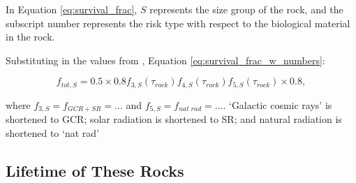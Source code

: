 \documentclass{article}
\begin{document}
In Equation \ref{eq:survival_frac}, $S$ represents the size group of the rock, and the subscript number represents the risk type with respect to the biological material in the rock.

Substituting in the values from \citet{mileikowsky2000risks}, Equation \ref{eq:survival_frac_w_numbers}:

\begin{equation}
    f_{tot,S} = 0.5 \times 0.8 f_{3,S}(\tau_{rock}) f_{4,S}(\tau_{rock}) f_{5,S}(\tau_{rock}) \times 0.8,
    \label{eq:survival_frac_w_numbers}
\end{equation}

where $f_{3, S} = f_{GCR + SR} = ...$ and $f_{5, S} = f_{nat \; rad} = ...$. `Galactic cosmic rays' is shortened to GCR; solar radiation is shortened to SR; and natural radiation is shortened to `nat rad'


\subsection{Lifetime of These Rocks}





\end{document}
